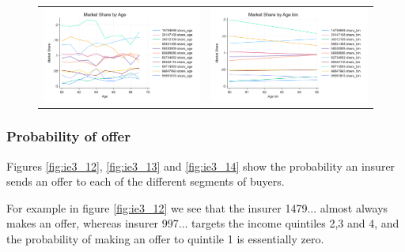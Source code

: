 \documentclass[12pt]{article}
\begin{document}
\begin{figure}[H] 
\caption{}
\label{fig:ie3_11}
\centering{}%
\begin{tabular}{cc}
\includegraphics[scale=0.24]{figures/IE3_supply_age.png} &
\includegraphics[scale=0.24]{figures/IE3_supply_agebin.png}
\end{tabular}
\end{figure}


\subsubsection{Probability of offer}
Figures \ref{fig:ie3_12}, \ref{fig:ie3_13} and \ref{fig:ie3_14} show the probability an insurer sends an offer to each of the different segments of buyers. 




For example in figure \ref{fig:ie3_12} we see that the insurer 1479... almost always makes an offer, whereas insurer 997... targets the income quintiles 2,3 and 4, and the probability of making an offer to quintile 1 is essentially zero. 
\end{document}
